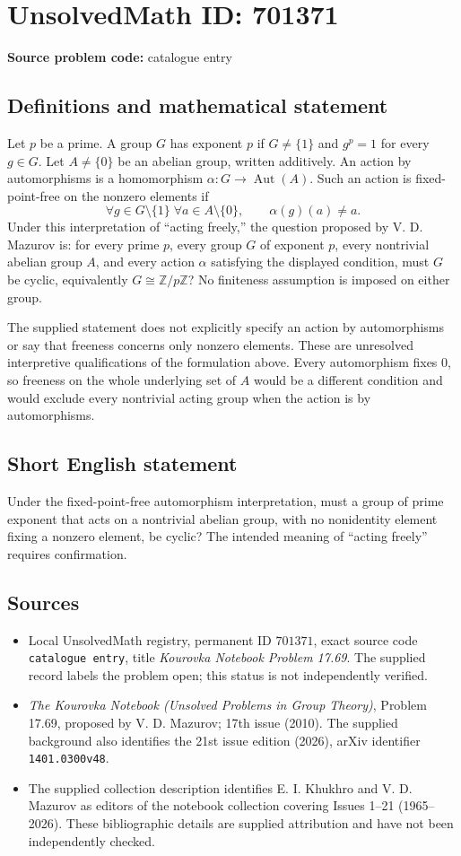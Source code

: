 \documentclass[11pt]{article}
\newcommand{\Z}{\mathbb{Z}}
\begin{document}
\section*{UnsolvedMath ID: 701371}
\textbf{Source problem code:} catalogue entry
\subsection{Definitions and mathematical statement}
Let \(p\) be a prime. A group \(G\) has exponent \(p\) if \(G\neq\{1\}\) and \(g^p=1\) for every \(g\in G\). Let \(A\neq\{0\}\) be an abelian group, written additively. An action by automorphisms is a homomorphism \(\alpha:G\to\operatorname{Aut}(A)\). Such an action is fixed-point-free on the nonzero elements if
\[
\forall g\in G\setminus\{1\}\;\forall a\in A\setminus\{0\},\qquad \alpha(g)(a)\neq a.
\]
Under this interpretation of ``acting freely,'' the question proposed by V. D. Mazurov is: for every prime \(p\), every group \(G\) of exponent \(p\), every nontrivial abelian group \(A\), and every action \(\alpha\) satisfying the displayed condition, must \(G\) be cyclic, equivalently \(G\cong\Z/p\Z\)? No finiteness assumption is imposed on either group.

The supplied statement does not explicitly specify an action by automorphisms or say that freeness concerns only nonzero elements. These are unresolved interpretive qualifications of the formulation above. Every automorphism fixes \(0\), so freeness on the whole underlying set of \(A\) would be a different condition and would exclude every nontrivial acting group when the action is by automorphisms.
\subsection{Short English statement}
Under the fixed-point-free automorphism interpretation, must a group of prime exponent that acts on a nontrivial abelian group, with no nonidentity element fixing a nonzero element, be cyclic? The intended meaning of ``acting freely'' requires confirmation.
\subsection{Sources}
\begin{itemize}
\item Local UnsolvedMath registry, permanent ID \(701371\), exact source code \texttt{catalogue entry}, title \emph{Kourovka Notebook Problem 17.69}. The supplied record labels the problem open; this status is not independently verified.
\item \emph{The Kourovka Notebook (Unsolved Problems in Group Theory)}, Problem 17.69, proposed by V. D. Mazurov; 17th issue (2010). The supplied background also identifies the 21st issue edition (2026), arXiv identifier \texttt{1401.0300v48}.
\item The supplied collection description identifies E. I. Khukhro and V. D. Mazurov as editors of the notebook collection covering Issues 1--21 (1965--2026). These bibliographic details are supplied attribution and have not been independently checked.
\end{itemize}
\end{document}
